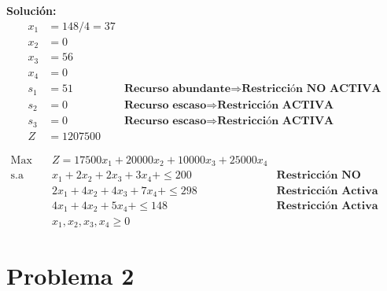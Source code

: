 \documentclass{templateNote}
\begin{document}
\begin{itemize}
    \textbf{Solución:}
    \begin{align*}
        x_1 &= 148/4 = 37 \\
        x_2 &= 0 \\
        x_3 &= 56 \\
        x_4 &= 0 \\
        s_1 &= 51 \qquad &\textbf{Recurso abundante} \Rightarrow \textbf{Restricci\'on NO ACTIVA} \\
        s_2 &= 0 \qquad &\textbf{Recurso escaso} \Rightarrow \textbf{Restricci\'on ACTIVA} \\
        s_3 &= 0 \qquad &\textbf{Recurso escaso} \Rightarrow \textbf{Restricci\'on ACTIVA} \\
        Z &= 1207500
    \end{align*}

    \begin{equation*}
        \begin{aligned}
            \text{Max} \quad & Z = 17500x_1 + 20000x_2 + 10000x_3 + 25000x_4 \\
            \text{s.a} \quad & x_1 + 2x_2 + 2x_3 + 3x_4 + \leq 200 \qquad &\textbf{Restricci\'on NO Activa} \\
            & 2x_1 + 4x_2 + 4x_3 + 7x_4 + \leq 298 \qquad &\textbf{Restricci\'on Activa} \\
            & 4x_1 + 4x_2 + 5x_4 + \leq 148 \qquad &\textbf{Restricci\'on Activa} \\
            & x_1, x_2, x_3, x_4 \geq 0
        \end{aligned}
    \end{equation*}
\end{itemize}

\newpage
\section*{Problema 2}
\end{document}
